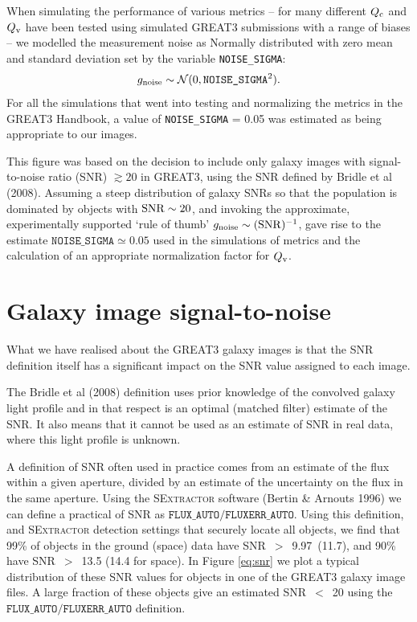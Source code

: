 \documentclass[preprint,11pt]{aastex}
\begin{document}
When simulating the performance of various metrics -- for many different
$Q_{\rm c}$ and $Q_{\rm v}$ have been tested using simulated GREAT3
submissions with a range of biases -- we modelled the measurement
noise as Normally distributed with zero mean and standard deviation
set by the variable \texttt{NOISE\_SIGMA}:
\begin{equation}
g_{\rm noise} \sim \mathcal{N}(0, \texttt{NOISE\_SIGMA}^2).
\end{equation}
For all the simulations that went into testing and normalizing the
metrics in the GREAT3 Handbook, a value of \texttt{NOISE\_SIGMA} =
0.05 was estimated as being appropriate to our images.

This figure was based on the decision to include only galaxy images
with signal-to-noise ratio (SNR) $\gtrsim 20$ in GREAT3, using the SNR
defined by Bridle et al (2008).  Assuming a steep distribution of
galaxy SNRs so that the population is dominated by objects with ${\rm
  SNR} \sim 20$, and invoking the approximate, experimentally
supported `rule of thumb' $g_{\rm noise} \sim ({\rm SNR})^{-1}$, gave
rise to the estimate $\texttt{NOISE\_SIGMA} \simeq 0.05$ used in the
simulations of metrics and the calculation of an appropriate
normalization factor for $Q_{\rm v}$.

\section{Galaxy image signal-to-noise}\label{sec:snr}
What we have realised about the GREAT3 galaxy images is that the SNR
definition itself has a significant impact on the SNR value assigned
to each image.

The Bridle et al (2008) definition uses prior knowledge of the
convolved galaxy light profile and in that respect is an optimal
(matched filter) estimate of the SNR.  It also means that it cannot be
used as an estimate of SNR in real data, where this light profile is
unknown.

A definition of SNR often used in practice comes from an estimate of
the flux within a given aperture, divided by an estimate of the
uncertainty on the flux in the same aperture.  Using the
\textsc{SExtractor} software (Bertin \& Arnouts 1996) we can define a
practical of SNR as $\texttt{FLUX\_AUTO} / \texttt{FLUXERR\_AUTO}$.
Using this definition, and \textsc{SExtractor} detection settings that
securely locate all objects, we find that 99\% of objects in the
ground (space) data have SNR~$>$~9.97~(11.7), and 90\% have
SNR~$>$~13.5 (14.4 for space).  In Figure \ref{eq:snr} we plot a
typical distribution of these SNR values for objects in one of the
GREAT3 galaxy image files.  A large fraction of these objects give an
estimated SNR~$<$~20 using the  $\texttt{FLUX\_AUTO} /
\texttt{FLUXERR\_AUTO}$ definition.
\end{document}
